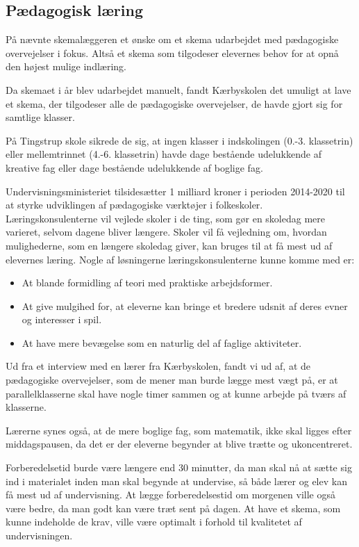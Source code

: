 \subsection{Pædagogisk læring}
\label{paedagogisk_laering}
På \school nævnte skemalæggeren et ønske om et skema udarbejdet med pædagogiske overvejelser i fokus. Altså et skema som tilgodeser elevernes behov for at opnå den højest mulige indlæring.

Da skemaet i år blev udarbejdet manuelt, fandt Kærbyskolen det umuligt at lave et skema, der tilgodeser alle de pædagogiske overvejelser, de havde gjort sig for samtlige klasser\cite{interview_Kaerby}.

På Tingstrup skole sikrede de sig, at ingen klasser i indskolingen (0.-3. klassetrin) eller mellemtrinnet (4.-6. klassetrin) havde dage bestående udelukkende af kreative fag eller dage bestående udelukkende af boglige fag. 

Undervisningsministeriet tilsidesætter 1 milliard kroner i perioden 2014-2020 til at styrke udviklingen af pædagogiske værktøjer i folkeskoler. Læringskonsulenterne vil vejlede skoler i de ting, som gør en skoledag mere varieret, selvom dagene bliver længere. Skoler vil få vejledning om, hvordan mulighederne, som en længere skoledag giver, kan bruges til at få mest ud af elevernes læring. Nogle af løsningerne læringskonsulenterne kunne komme med er:
\begin{itemize}
	\item At blande formidling af teori med praktiske arbejdsformer.
	\item At give mulgihed for, at eleverne kan bringe et bredere udsnit af deres evner og interesser i spil.
	\item At have mere bevægelse som en naturlig del af faglige aktiviteter\cite{Paedagogisklaering}.
\end{itemize}
Ud fra et interview med en lærer fra Kærbyskolen, fandt vi ud af, at de pædagogiske overvejelser, som de mener man burde lægge mest vægt på, er at parallelklasserne skal have nogle timer sammen og at kunne arbejde på tværs af klasserne.

Lærerne synes også, at de mere boglige fag, som matematik, ikke skal ligges efter middagspausen, da det er der eleverne begynder at blive trætte og ukoncentreret. 

Forberedelsetid burde være længere end 30 minutter, da man skal nå at sætte sig ind i materialet inden man skal begynde at undervise, så både lærer og elev kan få mest ud af undervisning. At lægge forberedelsestid om morgenen ville også være bedre, da man godt kan være træt sent på dagen. At have et skema, som kunne indeholde de krav, ville være optimalt i forhold til kvalitetet af undervisningen.